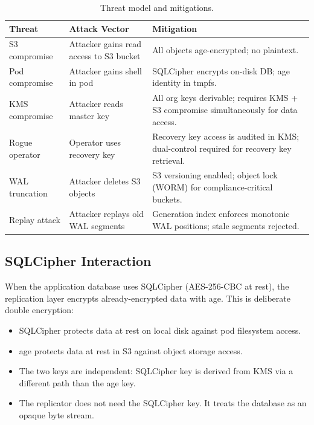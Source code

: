 \documentclass[11pt,a4paper]{article}
\begin{document}
\begin{table}[H]
\centering
\caption{Threat model and mitigations.}
\label{tab:threats}
\begin{tabular}{@{}lp{4cm}p{5cm}@{}}
\toprule
\textbf{Threat} & \textbf{Attack Vector} & \textbf{Mitigation} \\
\midrule
S3 compromise & Attacker gains read access to S3 bucket &
  All objects age-encrypted; no plaintext. \\
Pod compromise & Attacker gains shell in pod &
  SQLCipher encrypts on-disk DB; age identity in tmpfs. \\
KMS compromise & Attacker reads master key &
  All org keys derivable; requires KMS + S3 compromise
  simultaneously for data access. \\
Rogue operator & Operator uses recovery key &
  Recovery key access is audited in KMS; dual-control
  required for recovery key retrieval. \\
WAL truncation & Attacker deletes S3 objects &
  S3 versioning enabled; object lock (WORM) for
  compliance-critical buckets. \\
Replay attack & Attacker replays old WAL segments &
  Generation index enforces monotonic WAL positions;
  stale segments rejected. \\
\bottomrule
\end{tabular}
\end{table}

\subsection{SQLCipher Interaction}

When the application database uses SQLCipher (AES-256-CBC at rest),
the replication layer encrypts already-encrypted data with age. This
is deliberate double encryption:

\begin{itemize}[nosep]
  \item SQLCipher protects data at rest on local disk against pod
    filesystem access.
  \item age protects data at rest in S3 against object storage access.
  \item The two keys are independent: SQLCipher key is derived from
    KMS via a different path than the age key.
  \item The replicator does not need the SQLCipher key. It treats the
    database as an opaque byte stream.
\end{itemize}
\end{document}
